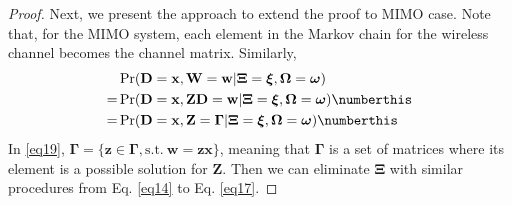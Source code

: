 \begin{proof}
Next, we present the approach to extend the proof to MIMO case. Note that, for the MIMO system, each element in the Markov chain for the wireless channel becomes the channel matrix. Similarly,
\begin{subequations}
\begin{align*}
&\Pr(\mathbf{D}=\mathbf{x},\mathbf{W}=\mathbf{w}|\mathbf{\Xi}=\boldsymbol{\xi},\mathbf{\Omega}=\boldsymbol{\omega})\\
=&\Pr(\mathbf{D}=\mathbf{x},\mathbf{ZD}=\mathbf{w}|\mathbf{\Xi}=\boldsymbol{\xi},\mathbf{\Omega}=\boldsymbol{\omega}) \numberthis \label{eq18}\\
=&\Pr(\mathbf{D}=\mathbf{x},\mathbf{Z}=\mathbf{\Gamma}|\mathbf{\Xi}=\boldsymbol{\xi},\mathbf{\Omega}=\boldsymbol{\omega}) \numberthis \label{eq19}
\end{align*}
\end{subequations}
In \eqref{eq19}, $\mathbf{\Gamma} = \{\mathbf{z} \in \mathbf{\Gamma}, \text{s.t.} ~\mathbf{w} = \mathbf{zx}\}$, meaning that $\mathbf{\Gamma}$ is a set of matrices where its element is a possible solution for $\mathbf{Z}$. Then we can eliminate $\mathbf{\Xi}$ with similar procedures from Eq. \eqref{eq14} to Eq. \eqref{eq17}.  

\end{proof}
